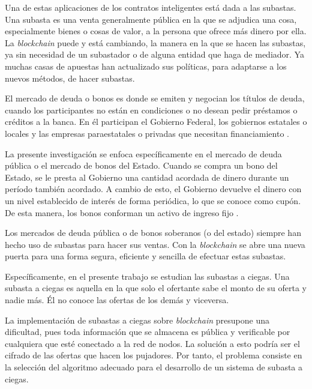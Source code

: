   Una de estas aplicaciones de los contratos inteligentes está dada a las subastas. Una subasta es una venta generalmente pública en la 
  que se adjudica una cosa, especialmente bienes o cosas de valor, a la persona que ofrece más dinero por ella. La \textit{blockchain} puede y 
  está cambiando, la manera en la que se hacen las subastas, ya sin necesidad de un subastador o de alguna entidad que haga de mediador. 
  Ya muchas casas de apuestas han actualizado sus políticas, para adaptarse a los nuevos métodos, de hacer subastas. 

  El mercado de deuda o bonos es donde se emiten y negocian los títulos de deuda, cuando los participantes no están en condiciones o no desean pedir préstamos o créditos a la banca. En él participan el Gobierno Federal, los gobiernos estatales o locales y las empresas paraestatales o privadas que necesitan financiamiento \parencite{bancomexico}.

  La presente investigación se enfoca específicamente en el mercado de deuda pública o el mercado de bonos del Estado. Cuando se compra un bono del Estado, se le presta al Gobierno una cantidad acordada de dinero durante un período también acordado. A cambio de esto, el Gobierno devuelve el dinero con un nivel establecido de interés de forma periódica, lo que se conoce como cupón. De esta manera, los bonos conforman un activo de ingreso fijo \parencite{igbonos}.

  Los mercados de deuda pública o de bonos soberanos (o del estado) siempre han hecho uso de subastas para hacer sus ventas. Con la \textit{blockchain} se abre una nueva puerta para una forma segura, eficiente y sencilla de efectuar estas subastas.

  Específicamente, en el presente trabajo se estudian las subastas a ciegas. Una subasta a ciegas es aquella en la que solo el ofertante 
  sabe el monto de su oferta y nadie más. Él no conoce las ofertas de los demás y viceversa.

  La implementación de subastas a ciegas sobre \textit{blockchain} presupone una dificultad, pues toda información que se almacena es pública y 
  verificable por cualquiera que esté conectado a la red de nodos. La solución a esto podría ser el cifrado de las ofertas que hacen 
  los pujadores. Por tanto, el problema consiste en la selección del algoritmo adecuado para el desarrollo de un sistema de 
  subasta a ciegas.

